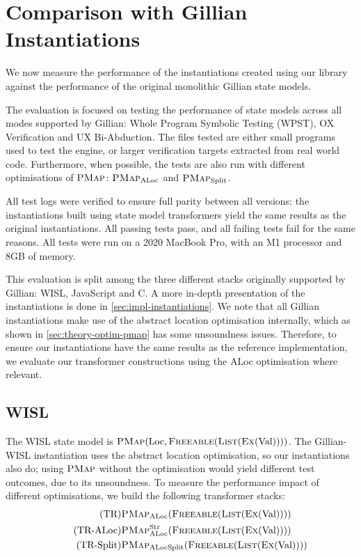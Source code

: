 \section{Comparison with Gillian Instantiations} \label{sec:comparison-gillian}

We now measure the performance of the instantiations created using our library against the performance of the original monolithic Gillian state models.

The evaluation is focused on testing the performance of state models across all modes supported by Gillian: Whole Program Symbolic Testing (WPST), OX Verification and UX Bi-Abduction. The files tested are either small programs used to test the engine, or larger verification targets extracted from real world code. Furthermore, when possible, the tests are also run with different optimisations of $\textsc{PMap}$: $\textsc{PMap}_{\text{ALoc}}$ and $\textsc{PMap}_{\text{Split}}$.

All test logs were verified to ensure full parity between all versions: the instantiations built using state model transformers yield the same results as the original instantiations. All passing tests pass, and all failing tests fail for the same reasons. All tests were run on a 2020 MacBook Pro, with an M1 processor and 8GB of memory.

This evaluation is split among the three different stacks originally supported by Gillian: WISL, JavaScript and C. A more in-depth presentation of the instantiations is done in \cref{sec:impl-instantiations}. We note that all Gillian instantiations make use of the abstract location optimisation internally, which as shown in \cref{sec:theory-optim-pmap} has some unsoundness issues. Therefore, to ensure our instantiations have the same results as the reference implementation, we evaluate our transformer constructions using the ALoc optimisation where relevant.

\subsection{WISL}

The WISL state model is $\textsc{PMap}(\text{Loc}, \textsc{Freeable}(\textsc{List}(\textsc{Ex}(\text{Val}))))$. The Gillian-WISL instantiation uses the abstract location optimisation, so our instantiations also do; using $\textsc{PMap}$ without the optimisation would yield different test outcomes, due to its unsoundness.  To measure the performance impact of different optimisations, we build the following transformer stacks: \begin{align}
\tag{TR}       & \textsc{PMap}_{\text{ALoc}}(\textsc{Freeable}(\textsc{List}(\textsc{Ex}(\text{Val})))) \\
\tag{TR-ALoc}  & \textsc{PMap}_{\text{ALoc}}^{\text{Str}}(\textsc{Freeable}(\textsc{List}(\textsc{Ex}(\text{Val})))) \\
\tag{TR-Split} & \textsc{PMap}_{\text{ALocSplit}}(\textsc{Freeable}(\textsc{List}(\textsc{Ex}(\text{Val}))))
\end{align}

